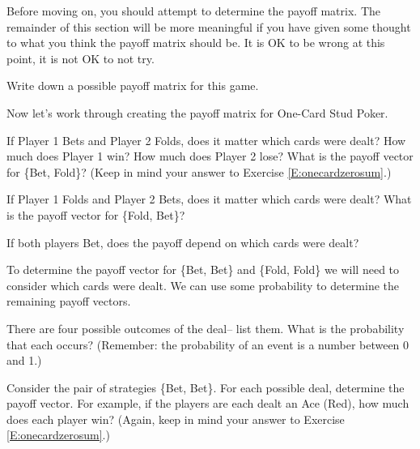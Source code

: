 Before moving on, you should attempt to determine the payoff matrix. The remainder of this section will be more meaningful if you have given some thought to what you think the payoff matrix should be. It is OK to be wrong at this point, it is not OK to not try. 

\begin{xca}\label{E:possiblematrix}
Write down a possible payoff matrix for this game.
\end{xca}

Now let's work through creating the payoff matrix for One-Card Stud Poker.



\begin{xca}\label{E:payoffBF}
If Player 1 Bets and Player 2 Folds, does it matter which cards were dealt? How much does Player 1 win? How much does Player 2 lose? What is the payoff vector for \{Bet, Fold\}? (Keep in mind your answer to Exercise \ref{E:onecardzerosum}.)
\end{xca}

\begin{xca}\label{E:payoffFB}
If Player 1 Folds and Player 2 Bets, does it matter which cards were dealt? What is the payoff vector for \{Fold, Bet\}? 
\end{xca}


\begin{xca}
If both players Bet, does the payoff depend on which cards were dealt?
\end{xca}


To determine the payoff vector for \{Bet, Bet\} and \{Fold, Fold\} we will need to consider which cards were dealt. We can use some probability to determine the remaining payoff vectors.


\begin{xca}\label{E:probofdeal}
There are four possible outcomes of the deal-- list them. What is the probability that each occurs? (Remember: the probability of an event is a number between 0 and 1.)
\end{xca}


\begin{xca}\label{E:BBpayoffperdeal}
Consider the pair of strategies \{Bet, Bet\}. For each possible deal, determine the payoff vector. For example, if the players are each dealt an Ace (Red), how much does each player win? (Again, keep in mind your answer to Exercise \ref{E:onecardzerosum}.)
\end{xca}

